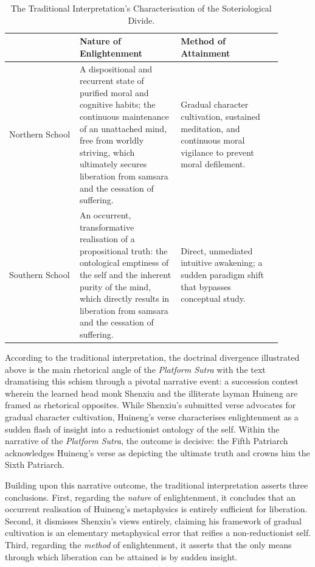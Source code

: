 \vspace{-1.3em}
\begin{table}[h!]
    \caption{The Traditional Interpretation's Characterisation of the
Soteriological Divide.}
\vspace{0.5em}
    \label{tab:table1}
    \begin{tabular}{|p{0.23\linewidth}|p{0.33\linewidth}|p{0.33\linewidth}|} %
      \hline
       & \textbf{Nature of Enlightenment} & \textbf{Method of Attainment}\\
      \hline
      Northern School & A dispositional and recurrent state of purified moral and cognitive habits; the continuous maintenance of an unattached mind, free from worldly striving, which ultimately secures liberation from samsara and the cessation of suffering. & Gradual character cultivation, sustained meditation, and continuous moral vigilance to prevent moral defilement. \\
      \hline
      Southern School & An occurrent, transformative realisation of a propositional truth: the ontological emptiness of the self and the inherent purity of the mind, which directly results in liberation from samsara and the cessation of suffering. & Direct, unmediated intuitive awakening; a sudden paradigm shift that bypasses conceptual study. \\
      \hline
    \end{tabular}
\end{table}

\noindent According to the traditional interpretation, the doctrinal divergence
illustrated above is the main rhetorical angle of the \emph{Platform
Sutra} with the text dramatising this schism through a pivotal narrative
event: a succession contest wherein the learned head monk Shenxiu and
the illiterate layman Huineng are framed as rhetorical opposites. While
Shenxiu's submitted verse advocates for gradual character cultivation,
Huineng's verse characterises enlightenment as a sudden flash of insight
into a reductionist ontology of the self. Within the narrative of the
\emph{Platform Sutra}, the outcome is decisive: the Fifth Patriarch
acknowledges Huineng's verse as depicting the ultimate truth and crowns
him the Sixth Patriarch.

Building upon this narrative outcome, the traditional interpretation
asserts three conclusions. First, regarding the \emph{nature} of
enlightenment, it concludes that an occurrent realisation of Huineng's
metaphysics is entirely sufficient for liberation. Second, it dismisses
Shenxiu's views entirely, claiming his framework of gradual cultivation
is an elementary metaphysical error that reifies a non-reductionist
self. Third, regarding the \emph{method} of enlightenment, it asserts
that the only means through which liberation can be attained is by
sudden insight.

